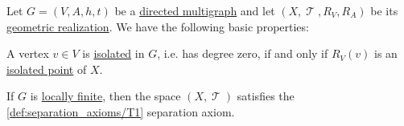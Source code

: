 \begin{proposition}\label{thm:def:graph_geometric_realization}
  Let \( G = (V, A, h, t) \) be a \hyperref[def:directed_multigraph]{directed multigraph} and let \( (X, \mscrT, R_V, R_A) \) be its \hyperref[def:graph_geometric_realization]{geometric realization}. We have the following basic properties:

  \begin{thmenum}
     A vertex \( v \in V \) is \hyperref[def:isolated_vertex]{isolated} in \( G \), i.e. has degree zero, if and only if \( R_V(v) \) is an \hyperref[def:set_cluster_point]{isolated point} of \( X \).

     If \( G \) is \hyperref[def:graph_cardinality/local]{locally finite}, then the space \( (X, \mscrT) \) satisfies the \ref{def:separation_axioms/T1} separation axiom.
  \end{thmenum}
\end{proposition}
